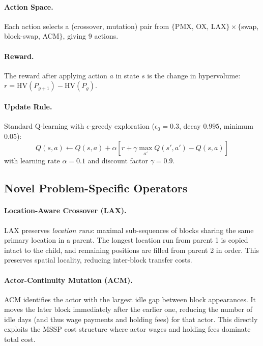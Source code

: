 \paragraph{Action Space.}
Each action selects a (crossover, mutation) pair from $\{$PMX, OX, LAX$\} \times \{$swap, block-swap, ACM$\}$, giving 9 actions.

\paragraph{Reward.}
The reward after applying action $a$ in state $s$ is the change in hypervolume:
$r = \text{HV}(P_{g+1}) - \text{HV}(P_g)$.

\paragraph{Update Rule.}
Standard Q-learning with $\epsilon$-greedy exploration ($\epsilon_0 = 0.3$, decay $0.995$, minimum $0.05$):
\begin{equation}
Q(s, a) \leftarrow Q(s, a) + \alpha \left[ r + \gamma \max_{a'} Q(s', a') - Q(s, a) \right]
\label{eq:qlearning}
\end{equation}
with learning rate $\alpha = 0.1$ and discount factor $\gamma = 0.9$.

\subsection{Novel Problem-Specific Operators}
\label{sec:novel_ops}

\paragraph{Location-Aware Crossover (LAX).}
LAX preserves \emph{location runs}: maximal sub-sequences of blocks sharing the same primary location in a parent.
The longest location run from parent 1 is copied intact to the child, and remaining positions are filled from parent 2 in order.
This preserves spatial locality, reducing inter-block transfer costs.

\paragraph{Actor-Continuity Mutation (ACM).}
ACM identifies the actor with the largest idle gap between block appearances.
It moves the later block immediately after the earlier one, reducing the number of idle days (and thus wage payments and holding fees) for that actor.
This directly exploits the MSSP cost structure where actor wages and holding fees dominate total cost.

